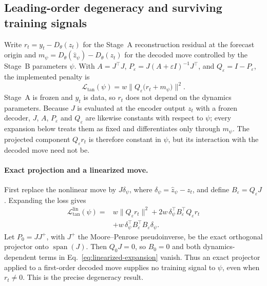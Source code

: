 \documentclass{article} %
\begin{document}
\subsection{Leading-order degeneracy and surviving training signals}
\label{sec:analysis-inert}
Write $r_t = y_t - D_\theta(z_t)$ for the Stage~A reconstruction residual at the
forecast origin and
$m_\psi = D_\theta(\hat z_\psi) - D_\theta(z_t)$ for the decoded move controlled by
the Stage~B parameters $\psi$. With $A = J^{\top}J$,
$P_\varepsilon = J(A + \varepsilon I)^{-1}J^{\top}$, and
$Q_\varepsilon=I-P_\varepsilon$, the implemented penalty is
\begin{equation}
  \mathcal{L}_{\mathrm{tan}}(\psi)
  =w\big\lVert Q_\varepsilon\big(r_t+m_\psi\big)\big\rVert^2 .
  \label{eq:penalty-actual}
\end{equation}
Stage~A is frozen and $y_t$ is data, so $r_t$ does not depend on the dynamics
parameters. Because $J$ is evaluated at the encoder output $z_t$ with a frozen
decoder, $J$, $A$, $P_\varepsilon$ and $Q_\varepsilon$ are likewise constants with
respect to $\psi$; every expansion below treats them as fixed and differentiates only
through $m_\psi$. The projected component $Q_\varepsilon r_t$ is therefore constant
in $\psi$, but its interaction with the decoded move need not be.
\paragraph{Exact projection and a linearized move.} First replace the nonlinear
move by $J\delta_\psi$, where $\delta_\psi=\hat z_\psi-z_t$, and define
$B_\varepsilon=Q_\varepsilon J$. Expanding the loss gives
\begin{equation}
\begin{split}
  \mathcal{L}_{\mathrm{tan}}^{\mathrm{lin}}(\psi)
  ={}&w\lVert Q_\varepsilon r_t\rVert^2
  +2w\,\delta_\psi^{\top}B_\varepsilon^{\top}Q_\varepsilon r_t\\
  &+w\,\delta_\psi^{\top}B_\varepsilon^{\top}B_\varepsilon\delta_\psi .
  \label{eq:linearized-expansion}
\end{split}
\end{equation}
Let $P_0=JJ^+$, with $J^+$ the Moore--Penrose pseudoinverse, be the exact
orthogonal projector onto
$\operatorname{span}(J)$. Then $Q_0J=0$, so $B_0=0$ and both
dynamics-dependent terms in Eq.~\eqref{eq:linearized-expansion} vanish. Thus an
exact projector applied to a first-order decoded move supplies no training signal to
$\psi$, even when $r_t\ne0$. This is the precise degeneracy result.
\end{document}
